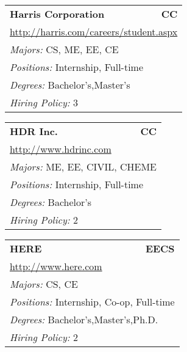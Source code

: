 \documentclass[twoside]{article}
\begin{document}
\begin{center}
\begin{multicols}{3}
\begin{FlushLeft}
\begin{minipage}{.9\columnwidth}
\end{minipage}
 
\begin{minipage}{.9\columnwidth}\begin{tabularx}{.95\columnwidth}{Xr}
                 {\Large\bf Harris Corporation} & {\Large\bf CC}\\
    \multicolumn{2}{p{.95\columnwidth}}{\url{http://harris.com/careers/student.aspx}}\\
    \multicolumn{2}{p{.95\columnwidth}}{\emph{Majors:} CS, ME, EE, CE}\\
    \multicolumn{2}{p{.95\columnwidth}}{\emph{Positions:} Internship, Full-time}\\
    \multicolumn{2}{p{.95\columnwidth}}{\emph{Degrees:} Bachelor's,Master's}\\
    \multicolumn{2}{p{.95\columnwidth}}{\emph{Hiring Policy:} 3}\\
    \end{tabularx}
    
\end{minipage}
 
\begin{minipage}{.9\columnwidth}\begin{tabularx}{.95\columnwidth}{Xr}
                 {\Large\bf HDR Inc.} & {\Large\bf CC}\\
    \multicolumn{2}{p{.95\columnwidth}}{\url{http://www.hdrinc.com}}\\
    \multicolumn{2}{p{.95\columnwidth}}{\emph{Majors:} ME, EE, CIVIL, CHEME}\\
    \multicolumn{2}{p{.95\columnwidth}}{\emph{Positions:} Internship, Full-time}\\
    \multicolumn{2}{p{.95\columnwidth}}{\emph{Degrees:} Bachelor's}\\
    \multicolumn{2}{p{.95\columnwidth}}{\emph{Hiring Policy:} 2}\\
    \end{tabularx}
    
\end{minipage}
 
\begin{minipage}{.9\columnwidth}\begin{tabularx}{.95\columnwidth}{Xr}
                 {\Large\bf HERE} & {\Large\bf EECS}\\
    \multicolumn{2}{p{.95\columnwidth}}{\url{http://www.here.com}}\\
    \multicolumn{2}{p{.95\columnwidth}}{\emph{Majors:} CS, CE}\\
    \multicolumn{2}{p{.95\columnwidth}}{\emph{Positions:} Internship, Co-op, Full-time}\\
    \multicolumn{2}{p{.95\columnwidth}}{\emph{Degrees:} Bachelor's,Master's,Ph.D.}\\
    \multicolumn{2}{p{.95\columnwidth}}{\emph{Hiring Policy:} 2}\\
    \end{tabularx}
    

\end{minipage}
\end{FlushLeft}
\end{multicols}
\end{center}
\end{document}
